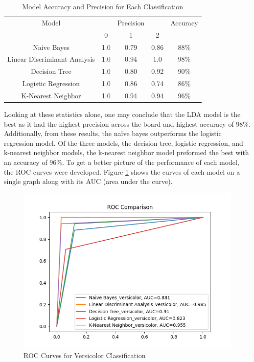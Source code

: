\documentclass[journal]{IEEEtran}
\begin{document}
\begin{table}[h!]
\centering
\begin{tabular}{ c | c c c | c}
    Model & & Precision & & Accuracy \\ 
        & 0 & 1 & 2 \\
\hline
Naive Bayes & 1.0    & 0.79 & 0.86 & 88\% \\
Linear Discriminant Analysis  &    1.0    &    0.94   &  1.0 & 98\%\\
Decision Tree   &    1.0    &    0.80   &  0.92 & 90\% \\
Logistic Regression   &    1.0    &    0.86   &  0.74 & 86\%\\
K-Nearest Neighbor  &     1.0   &     0.94  &   0.94 & 96\%\\

\end{tabular}
\caption{Model Accuracy and Precision for Each Classification}
\label{table:stats}
\end{table}

Looking at these statistics alone, one may conclude that the LDA model is the best as it had the highest precision across the board and highest accuracy of 98\%. Additionally, from these results, the naïve bayes outperforms the logistic regression model. Of the three models, the decision tree, logistic regression, and k-nearest neighbor models, the k-nearest neighbor model preformed the best with an accuracy of 96\%. To get a better picture of the performance of each model, the ROC curves were developed. Figure \ref{fig:versicolor} shows the curves of each model on a single graph along with its AUC (area under the curve). 

\begin{figure}[h!]
\includegraphics[scale=0.6]{rocCurves_versicolor.png}
\centering
\caption{ROC Curves for Versicolor Classification}
\label{fig:versicolor}
\end{figure}
\end{document}
